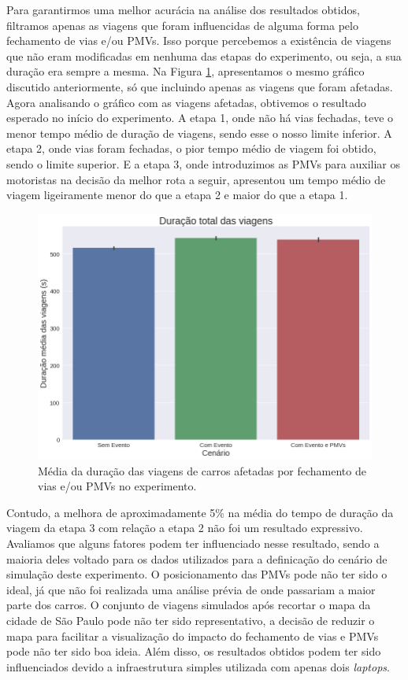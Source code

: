 Para garantirmos uma melhor acurácia na análise dos resultados obtidos, filtramos apenas as viagens que foram influencidas de alguma forma pelo fechamento de vias e/ou PMVs.
Isso porque percebemos a existência de viagens que não eram modificadas em nenhuma das etapas do experimento, ou seja, a sua duração era sempre a mesma.
Na Figura \ref{fig:duracao_filtered}, apresentamos o mesmo gráfico discutido anteriormente, só que incluindo apenas as viagens que foram afetadas.
Agora analisando o gráfico com as viagens afetadas, obtivemos o resultado esperado no início do experimento.
A etapa 1, onde não há vias fechadas, teve o menor tempo médio de duração de viagens, sendo esse o nosso limite inferior.
A etapa 2, onde vias foram fechadas, o pior tempo médio de viagem foi obtido, sendo o limite superior.
E a etapa 3, onde introduzimos as PMVs para auxiliar os motoristas na decisão da melhor rota a seguir, apresentou um tempo médio de viagem ligeiramente menor do que a etapa 2 e maior do que a etapa 1.

\begin{figure}[ht]
	\centering
	\includegraphics[width=.8\textwidth]{figuras/duracao_filtered.png}
	\caption{Média da duração das viagens de carros afetadas por fechamento de vias e/ou PMVs no experimento.}
	\label{fig:duracao_filtered}
\end{figure}

Contudo, a melhora de aproximadamente 5\% na média do tempo de duração da viagem da etapa 3 com relação a etapa 2 não foi um resultado expressivo.
Avaliamos que alguns fatores podem ter influenciado nesse resultado, sendo a maioria deles voltado para os dados utilizados para a definicação do cenário de simulação deste experimento.
O posicionamento das PMVs pode não ter sido o ideal, já que não foi realizada uma análise prévia de onde passariam a maior parte dos carros.
O conjunto de viagens simulados após recortar o mapa da cidade de São Paulo pode não ter sido representativo, a decisão de reduzir o mapa para facilitar a visualização do impacto do fechamento de vias
e PMVs pode não ter sido boa ideia.
Além disso, os resultados obtidos podem ter sido influenciados devido a infraestrutura simples utilizada com apenas dois \textit{laptops}.


